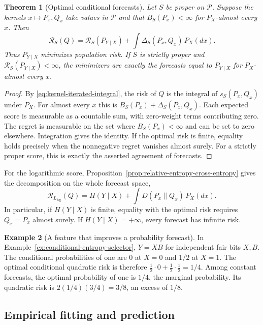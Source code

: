\documentclass[11pt,oneside]{book}
\newtheorem{theorem}{Theorem}[chapter]
\theoremstyle{definition}
\newtheorem{example}[theorem]{Example}
\theoremstyle{remark}
\begin{document}
\begin{theorem}[Optimal conditional forecasts]
\label{thm:proper-conditional-forecast}
Let $S$ be proper on $\mathcal P$. Suppose the kernels
$x\mapsto P_x,Q_x$ take values in $\mathcal P$ and that
$B_S(P_x)<\infty$ for $P_X$-almost every $x$. Then
\[
\mathcal R_S(Q)=\mathcal R_S(P_{Y\mid X})
 +\int\Delta_S(P_x,Q_x)\,P_X(dx).
\]
Thus $P_{Y\mid X}$ minimizes population risk. If $S$ is strictly
proper and $\mathcal R_S(P_{Y\mid X})<\infty$, the minimizers are
exactly the forecasts equal to $P_{Y\mid X}$ for $P_X$-almost every $x$.
\end{theorem}
\begin{proof}
By \eqref{eq:kernel-iterated-integral}, the risk of $Q$ is the integral
of $s_S(P_x,Q_x)$ under $P_X$. For almost every $x$ this is
$B_S(P_x)+\Delta_S(P_x,Q_x)$. Each expected score is measurable as
a countable sum, with zero-weight terms contributing zero. The
regret is measurable on the set where $B_S(P_x)<\infty$ and can be
set to zero elsewhere. Integration gives the identity.
If the optimal risk is finite, equality holds precisely when the
nonnegative regret vanishes almost surely. For a strictly proper
score, this is exactly the asserted agreement of forecasts.
\end{proof}

For the logarithmic score, Proposition~\ref{prop:relative-entropy-cross-entropy}
gives the decomposition on the whole forecast space,
\[
\mathcal R_{L_{\log}}(Q)
=H(Y\mid X)+\int D(P_x\|Q_x)\,P_X(dx).
\]
In particular, if $H(Y\mid X)$ is finite, equality with the optimal
risk requires $Q_x=P_x$ almost surely. If $H(Y\mid X)=+\infty$,
every forecast has infinite risk.

\begin{example}[A feature that improves a probability forecast]
\label{ex:brier-score-conditional-selector}
In Example~\ref{ex:conditional-entropy-selector}, $Y=XB$ for
independent fair bits $X,B$. The conditional probabilities of one are
$0$ at $X=0$ and $1/2$ at $X=1$. The optimal conditional quadratic
risk is therefore $\tfrac12\cdot0+\tfrac12\cdot\tfrac12=1/4$.
Among constant forecasts, the optimal probability of one is $1/4$,
the marginal probability. Its quadratic risk is
$2(1/4)(3/4)=3/8$, an excess of $1/8$.
\end{example}

\subsection{Empirical fitting and prediction}
\label{subsec:proper-score-estimation}
\end{document}
